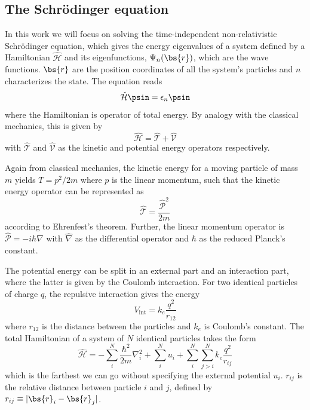 \subsection{The Schrödinger equation} \label{subsec:schrodinger}
In this work we will focus on solving the time-independent non-relativistic Schrödinger equation, which gives the energy eigenvalues of a system defined by a Hamiltonian $\hat{\mathcal{H}}$ and its eigenfunctions, $\Psi_n(\bs{r})$, which are the wave functions. $\bs{r}$ are the position coordinates of all the system's particles and $n$ characterizes the state. The equation reads
\begin{equation}
\label{eq:Energy}
 \hat{\mathcal{H}}\psin=\epsilon_n\psin
\end{equation}
where the Hamiltonian is operator of total energy. By analogy with the classical mechanics, this is given by
\begin{equation}
\hat{\mathcal{H}}=\hat{\mathcal{T}}+\hat{\mathcal{V}}
\end{equation}
with $\hat{\mathcal{T}}$ and $\hat{\mathcal{V}}$ as the kinetic and potential energy operators respectively. 

Again from classical mechanics, the kinetic energy for a moving particle of mass $m$ yields $T=p^2/2m$ where $p$ is the linear momentum, such that the kinetic energy operator can be represented as 
\begin{equation}
\hat{\mathcal{T}}=\frac{\hat{\mathcal{P}}^2}{2m}
\end{equation}
according to Ehrenfest's theorem. Further, the linear momentum operator is $\hat{\mathcal{P}}=-i\hbar\hat{\nabla}$ with $\hat{\nabla}$ as the differential operator and $\hbar$ as the reduced Planck's constant.

The potential energy can be split in an external part and an interaction part, where the latter is given by the Coulomb interaction. For two identical particles of charge $q$, the repulsive interaction gives the energy
\begin{equation}
V_{\text{int}} =k_e\frac{q^2}{r_{12}}
\end{equation}
where $r_{12}$ is the distance between the particles and $k_e$ is Coulomb's constant. The total Hamiltonian of a system of $N$ identical particles takes the form
\begin{equation}
\hat{\mathcal{H}}=-\sum_i^N\frac{\hbar^2}{2m}\nabla_i^2+\sum_i^{N}u_i + \sum_i^N\sum_{j>i}^Nk_e\frac{q^2}{r_{ij}}
\label{eq:ElectronicHamiltonian}
\end{equation}
which is the farthest we can go without specifying the external potential $u_i$. $r_{ij}$ is the relative distance between particle $i$ and $j$, defined by $r_{ij}\equiv|\bs{r}_i-\bs{r}_j|$.


